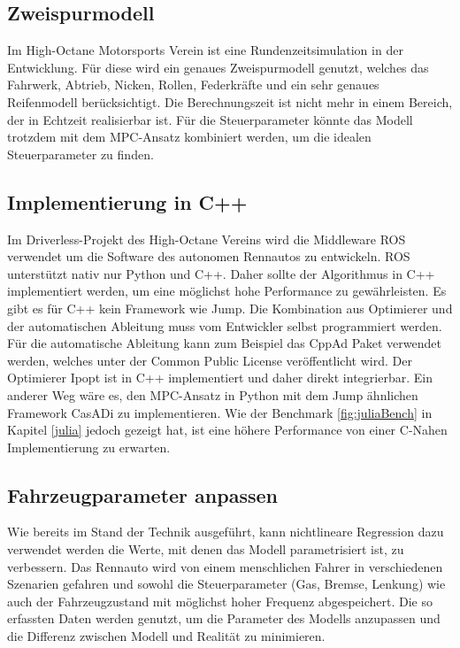 \documentclass{like}
\begin{document}
\subsection{Zweispurmodell}
Im High-Octane Motorsports Verein ist eine Rundenzeitsimulation in der Entwicklung. Für diese wird ein genaues Zweispurmodell genutzt, welches das Fahrwerk, Abtrieb, Nicken, Rollen, Federkräfte und ein sehr genaues Reifenmodell berücksichtigt. Die Berechnungszeit ist nicht mehr in einem Bereich, der in Echtzeit realisierbar ist. Für die Steuerparameter könnte das Modell trotzdem mit dem \ac{MPC}-Ansatz kombiniert werden, um die idealen Steuerparameter zu finden.

\subsection{Implementierung in C++}
Im Driverless-Projekt des High-Octane Vereins wird die Middleware \ac{ROS} verwendet um die Software des autonomen Rennautos zu entwickeln. \ac{ROS} unterstützt nativ nur Python und C++. Daher sollte der Algorithmus in C++ implementiert werden, um eine möglichst hohe Performance zu gewährleisten. 
Es gibt es für C++  kein Framework wie \ac{Jump}. Die Kombination aus Optimierer und der automatischen Ableitung muss vom Entwickler selbst programmiert werden. Für die automatische Ableitung kann zum Beispiel das CppAd Paket verwendet werden, welches unter der Common Public License veröffentlicht wird. Der Optimierer \ac{Ipopt} ist in C++ implementiert und daher direkt integrierbar. 
Ein anderer Weg wäre es, den \ac{MPC}-Ansatz in Python mit dem \ac{Jump} ähnlichen Framework CasADi zu implementieren. Wie der Benchmark \ref{fig:juliaBench} in Kapitel \ref{julia} jedoch gezeigt hat, ist eine höhere Performance von einer C-Nahen Implementierung zu erwarten. 

\subsection{Fahrzeugparameter anpassen}
Wie bereits im Stand der Technik ausgeführt, kann nichtlineare Regression dazu verwendet werden die Werte, mit denen das Modell parametrisiert ist, zu verbessern. Das Rennauto wird von einem menschlichen Fahrer in verschiedenen Szenarien gefahren und sowohl die Steuerparameter (Gas, Bremse, Lenkung) wie auch der Fahrzeugzustand mit möglichst hoher Frequenz abgespeichert. Die so erfassten Daten werden genutzt, um die Parameter des Modells anzupassen und die Differenz zwischen Modell und Realität zu minimieren. 


\appendix

%



%


\listoffigures
\listoftables

%


\end{document}

